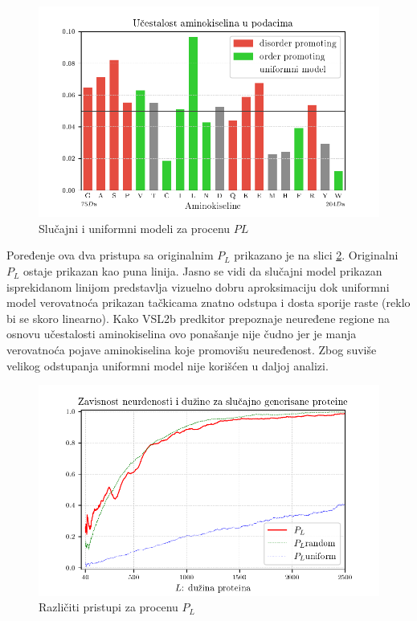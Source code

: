 \begin{figure}[th]
\centering
\includegraphics[]{plots/AK_ucestalost}
\decoRule
\caption{Slučajni i uniformni modeli za procenu $PL$}
\label{fig:AK_ucestalost}
\end{figure}



Poređenje ova dva pristupa sa originalnim $P_L$ prikazano je na slici
\ref{fig:PL2}.  Originalni $P_L$ ostaje prikazan kao puna linija. Jasno se vidi
da slučajni model prikazan isprekidanom linijom predstavlja vizuelno dobru
aproksimaciju dok uniformni model verovatnoća prikazan tačkicama znatno odstupa
i dosta sporije raste (reklo bi se skoro linearno). Kako VSL2b predkitor
prepoznaje neuređene regione na osnovu učestalosti aminokiselina ovo ponašanje
nije čudno jer je manja verovatnoća pojave aminokiselina koje promovišu
neuređenost. Zbog suviše velikog odstupanja uniformni model nije korišćen u
daljoj analizi.


\begin{figure}[th]
\centering
\includegraphics[]{plots/PL_F_cmp}
\decoRule
\caption{Različiti pristupi za procenu $P_L$}
\label{fig:PL2}
\end{figure}


